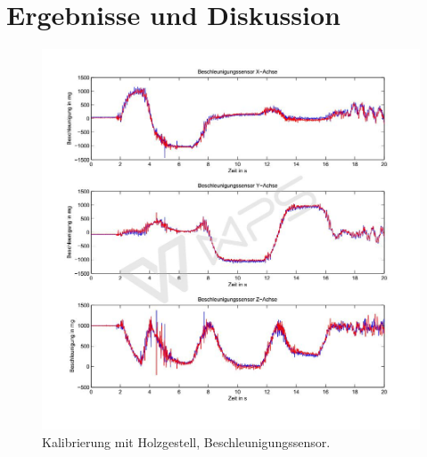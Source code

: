 
\lhead[\chaptername~\thechapter]{\rightmark}


\rhead[\leftmark]{}


\lfoot[\thepage]{}


\cfoot{}


\rfoot[]{\thepage}


\chapter{Ergebnisse und Diskussion}

\begin{figure}
	\centering
	\includegraphics[width=1\textwidth]{images/Messergebnisse/calibration-wood-accel111}
	\caption{Kalibrierung mit Holzgestell, Beschleunigungssensor.}
\end{figure}

